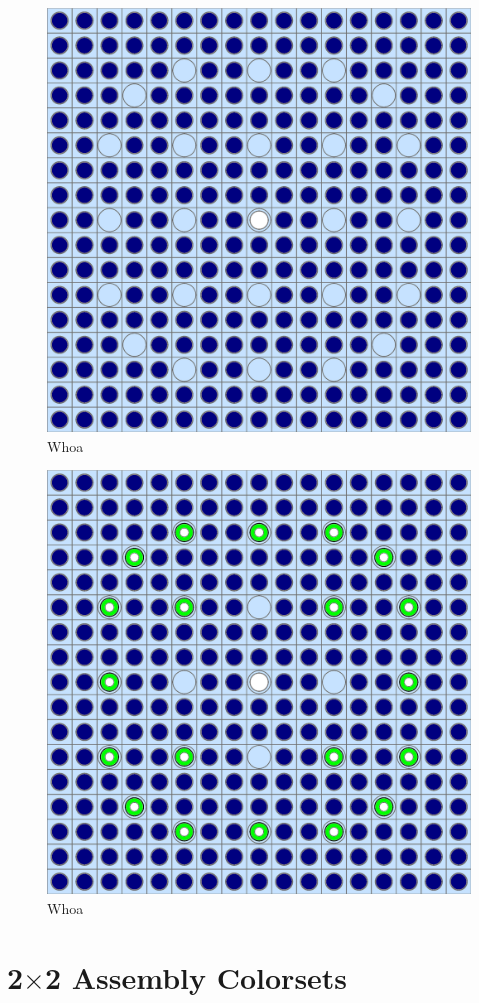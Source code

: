 \begin{figure}[h!]
  \centering
  \includegraphics[width=0.65\linewidth]{figures/benchmarks/assembly-31}
\caption[BEAVRS 3.1\% enriched assembly]{Whoa}
\label{fig:chap7-assm-31}
\end{figure}

\begin{figure}[h!]
  \centering
  \includegraphics[width=0.65\linewidth]{figures/benchmarks/assembly-31-20BPs}
\caption[BEAVRS 3.1\% enriched assembly with 20 \ac{BP}s]{Whoa}
\label{fig:chap7-assm-31-20BPs}
\end{figure}

\section{2$\times$2 Assembly Colorsets}
\label{subsec:chap7-2x2-colorsets}

